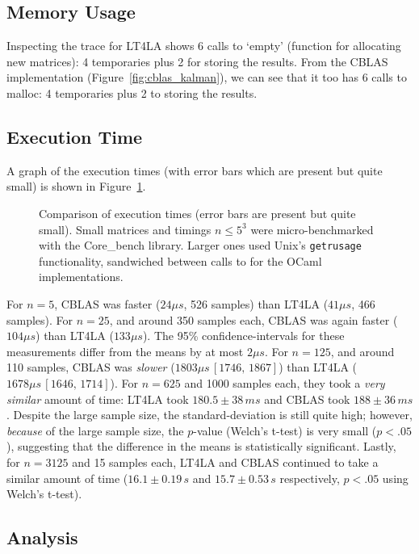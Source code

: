 \subsection{Memory Usage}

Inspecting the trace for LT4LA shows 6 calls to `empty' (function for
allocating new matrices): 4 temporaries plus 2 for storing the results. From
the CBLAS implementation (Figure~\ref{fig:cblas_kalman}), we can see that it
too has 6 calls to malloc: 4 temporaries plus 2 to storing the results.

\subsection{Execution Time}

A graph of the execution times (with error bars which are present but quite
small) is shown in Figure~\ref{fig:timings}.

\begin{figure}[t]
    \centering
    
    \caption{Comparison of execution times (error bars are present but quite
        small). Small matrices and timings $n \le 5^3$ were micro-benchmarked
        with the Core\_bench library. Larger ones used Unix's
        \texttt{getrusage} functionality, sandwiched between calls to
         for the OCaml implementations.}\label{fig:timings}
\end{figure}

For $n=5$, CBLAS was faster ($24\mu s$, 526 samples) than LT4LA ($41 \mu s$,
466 samples).  For $n=25$, and around 350 samples each, CBLAS was again faster
($104 \mu s$) than LT4LA ($133 \mu s$). The 95\% confidence-intervals for these
measurements differ from the means by at most $2 \mu s$. For $n=125$, and
around 110 samples, CBLAS was \emph{slower} ($1803 \mu s\, [1746,\, 1867]$)
than LT4LA ($1678 \mu s\, [1646,\, 1714]$). For $n=625$ and 1000 samples each,
they took a \emph{very similar} amount of time: LT4LA took $180.5 \pm 38 \,ms$
and CBLAS took $188 \pm 36 \, ms$. Despite the large sample size, the
standard-deviation is still quite high; however, \emph{because} of the large
sample size, the $p$-value (Welch's t-test) is very small ($p < .05$),
suggesting that the difference in the means is statistically significant.
Lastly, for $n=3125$ and 15 samples each, LT4LA and CBLAS continued to take a
similar amount of time ($16.1 \pm 0.19 \,s$ and $15.7 \pm 0.53 \,s$
respectively, $p<.05$ using Welch's t-test).

\subsection{Analysis}

